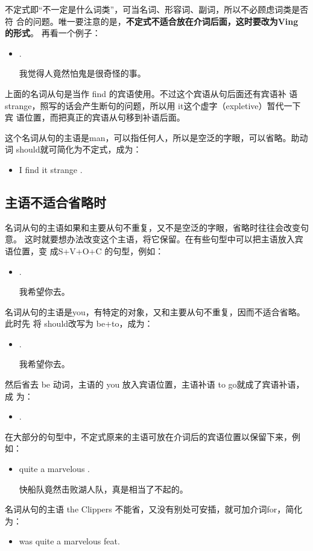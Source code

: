 不定式即“不一定是什么词类”，可当名词、形容词、副词，所以不必顾虑词类是否符
合的问题。唯一要注意的是，\textbf{不定式不适合放在介词后面，这时要改为Ving 的形式}。
再看一个例子：
\begin{itemize}
\item {}    .

  我觉得人竟然怕鬼是很奇怪的事。
\end{itemize}
上面的名词从句是当作 find 的宾语使用。不过这个宾语从句后面还有宾语补
语strange，照写的话会产生断句的问题，所以用 it这个虚字（expletive）暂代一下宾
语位置，而把真正的宾语从句移到补语后面。

这个名词从句的主语是man，可以指任何人，所以是空泛的字眼，可以省略。助动
词 should就可简化为不定式，成为：
\begin{itemize}
\item I find it strange .
\end{itemize}

\subsection{主语不适合省略时}

名词从句的主语如果和主要从句不重复，又不是空泛的字眼，省略时往往会改变句意。
这时就要想办法改变这个主语，将它保留。在有些句型中可以把主语放入宾语位置，变
成S+V+O+C 的句型，例如：
\begin{itemize}
\item {}  .

  我希望你去。
\end{itemize}
名词从句的主语是you，有特定的对象，又和主要从句不重复，因而不适合省略。此时先
将 should改写为 be+to，成为：
\begin{itemize}
\item {}  .

  我希望你去。
\end{itemize}
然后省去 be 动词，主语的 you 放入宾语位置，主语补语 to go就成了宾语补语，成
为：
\begin{itemize}
\item {}   .
\end{itemize}

在大部分的句型中，不定式原来的主语可放在介词后的宾语位置以保留下来，例如：
\begin{itemize}
\item {}  quite a marvelous .

  快船队竟然击败湖人队，真是相当了不起的。
\end{itemize}
名词从句的主语 the Clippers 不能省，又没有别处可安插，就可加介词for，简化
为：
\begin{itemize}
\item {} was quite a marvelous feat.
\end{itemize}

